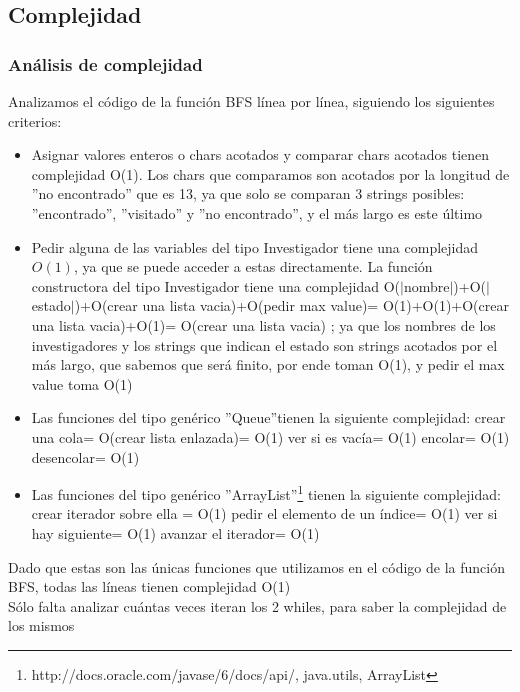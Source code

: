 \subsection{Complejidad}
\subsubsection{Análisis de complejidad}
\indent Analizamos el código de la función BFS línea por línea, siguiendo los
siguientes criterios:
\begin{itemize}
 \item Asignar valores enteros o chars acotados y comparar chars acotados
 tienen complejidad O(1). Los chars que comparamos son acotados por la
 longitud de ''no encontrado'' que es 13, ya que solo se
 comparan 3 strings posibles: ''encontrado'', ''visitado'' y ''no encontrado'', y
 el más largo es este último
 \item Pedir alguna de las variables del tipo Investigador tiene una complejidad
$O(1)$, 
 ya que se puede acceder a estas directamente.
 \subitem La función constructora del tipo Investigador tiene una complejidad 
 O($|$nombre$|$)+O($|$estado$|$)+O(crear una lista vacia)+O(pedir max value)=
 O(1)+O(1)+O(crear una lista vacia)+O(1)= O(crear una lista vacia) ;
 ya que los nombres de los investigadores y los strings que indican el estado
 son strings acotados por el más largo, que sabemos que será finito, por ende
toman O(1), y
 pedir el max value toma O(1)
 \item Las funciones del tipo genérico ''Queue''tienen la siguiente complejidad:
 \subitem crear una cola= O(crear lista enlazada)= O(1)
 \subitem ver si es vacía= O(1)
 \subitem encolar= O(1)
 \subitem desencolar= O(1)
 \item Las funciones del tipo genérico
''ArrayList''\footnote{http://docs.oracle.com/javase/6/docs/api/, java.utils,
ArrayList}  tienen
 la siguiente complejidad:
 \subitem crear iterador sobre ella = O(1)
 \subitem pedir el elemento de un índice= O(1)
 \subitem ver si hay siguiente= O(1)
 \subitem avanzar el iterador= O(1)
 
\end{itemize}

\indent Dado que estas son las únicas funciones que utilizamos en el código de
la función BFS, todas las líneas tienen complejidad O(1)\\
\indent Sólo falta analizar cuántas veces iteran los 2 whiles, para saber la 
complejidad de los mismos\\

